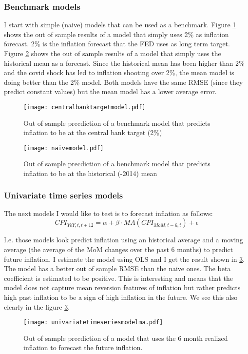 \documentclass[12pt]{article}
\begin{document}
\subsubsection{Benchmark models}
I start with simple (naive) models that can be used as a benchmark. Figure \ref{fig:cb_model} shows the out of sample results of a model that simply uses 2\% as inflation forecast. 2\% is the inflation forecast that the FED uses as long term target.
 Figure \ref{fig:naive_model} shows the out of sample results of a model that simply uses the historical mean as a forecast. Since the historical mean has been higher than 2\% and the covid shock has led to inflation shooting over 2\%, the mean model is doing better than the 2\% model. Both models have the same RMSE (since they predict constant values) but the mean model has a lower average error.


\begin{figure}[h]
    \centering
    \texttt{[image: centralbanktargetmodel.pdf]}
    \caption{Out of sample precdiction of a benchmark model that predicts inflation to be at the central bank target (2\%)}
    \label{fig:cb_model}
\end{figure}



\begin{figure}[h]
    \centering
    \texttt{[image: naivemodel.pdf]}
    \caption{Out of sample precdiction of a benchmark model that predicts inflation to be at the historical (-2014) mean}
    \label{fig:naive_model}
\end{figure}


\subsubsection{Univariate time series models}
\label{sec:univts}
The next models I would like to test is to forecast inflation as follows:
\begin{equation}
\label{eq:ma}
CPI_{YoY, t, t+12} = \alpha + \beta \cdot MA(CPI_{MoM,t-6,t})+\epsilon
\end{equation}

I.e. those models look predict inflation using an historical average and a moving average (the average of the MoM changes over the past 6 months) to predict future inflation. I estimate the model using OLS and I get the result shown in \ref{fig:univariatetimeseriesmodelma}. The model has a better out of sample RMSE than the naive ones. The beta coefficient is estimated to be positive. This is interesting and means that the model does not capture mean reversion features of inflation but rather predicts high past inflation to be a sign of high inflation in the future. We see this also clearly in the figure \ref{fig:univariatetimeseriesmodelma}.
\begin{figure}[h]
    \centering
    \texttt{[image: univariatetimeseriesmodelma.pdf]}
    \caption{Out of sample precdiction of a model that uses the 6 month realized inflation to forecast the future inflation.}
    \label{fig:univariatetimeseriesmodelma}
\end{figure}
\end{document}
